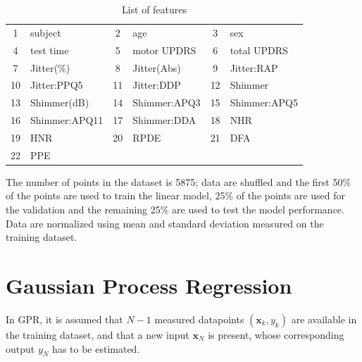 \documentclass[12pt]{article}
\begin{document}
\begin{table}
    \centering
    \begin{tabular}{||c|l||c|l||c|l|}
    \hline
        1 & subject & 2 & age & 3 & sex\\
        4 & test time & 5 & motor UPDRS & 6 & total UPDRS\\
        7 & Jitter(\%) & 8 & Jitter(Abs) & 9 & Jitter:RAP\\
        10 & Jitter:PPQ5 & 11 & Jitter:DDP & 12 & Shimmer\\
        13 & Shimmer(dB) & 14 & Shimmer:APQ3 & 15 & Shimmer:APQ5\\
        16 & Shimmer:APQ11 & 17 & Shimmer:DDA & 18 & NHR\\
        19 & HNR & 20 & RPDE & 21 & DFA\\
        22 & PPE &     &      &    &  \\
        \hline
    \end{tabular}
    \caption{List of features}
    \label{ta:feat}
\end{table}
The number of points in the dataset is 5875; data are shuffled and the first 50\% of the points are used to train the linear model, 25\% of the points are used for the validation and the remaining 25\% are used to test the model performance. Data are normalized using mean and standard deviation measured on the training dataset.

\section{Gaussian Process Regression}
In GPR, it is assumed that $N-1$ measured datapoints $(\mathbf{x}_k,y_k)$ are available in the training dataset, and that a new input  $\mathbf{x}_N$ is present, whose corresponding output $y_N$ has to be estimated. 
\end{document}
